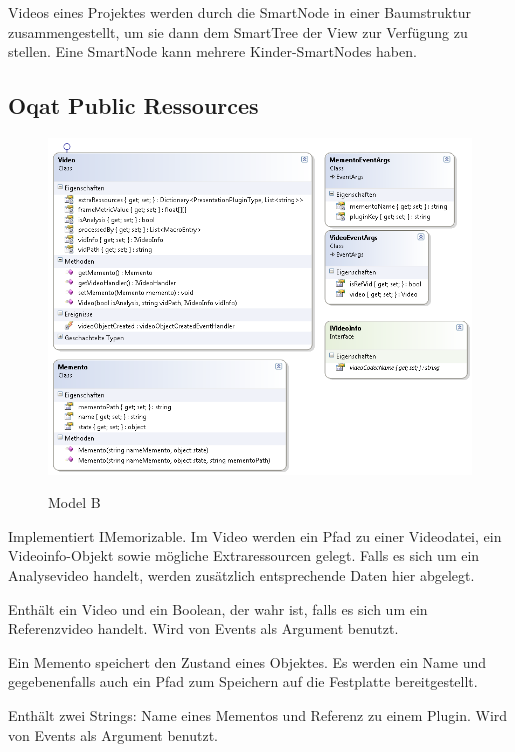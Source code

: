 Videos eines Projektes werden durch die SmartNode in einer Baumstruktur zusammengestellt, um sie dann dem SmartTree der View zur Verfügung zu stellen. Eine SmartNode kann mehrere Kinder-SmartNodes haben.

\pagebreak
\subsection{Oqat Public Ressources}
\begin{figure}[H]
\noindent\includegraphics[width=\linewidth]{bilder/Klassendiagramm/publicModel.png}
\label{Private Model B}
\caption{Model B}
\end{figure}

Implementiert IMemorizable. Im Video werden ein Pfad zu einer Videodatei, ein Videoinfo-Objekt sowie mögliche Extraressourcen gelegt. Falls es sich um ein Analysevideo handelt, werden zusätzlich entsprechende Daten hier abgelegt.


Enthält ein Video und ein Boolean, der wahr ist, falls es sich um ein Referenzvideo handelt. Wird von Events als Argument benutzt.


Ein Memento speichert den Zustand eines Objektes. Es werden ein Name und gegebenenfalls auch ein Pfad zum Speichern auf die Festplatte bereitgestellt.


Enthält zwei Strings: Name eines Mementos und Referenz zu einem Plugin. Wird von Events als Argument benutzt.


